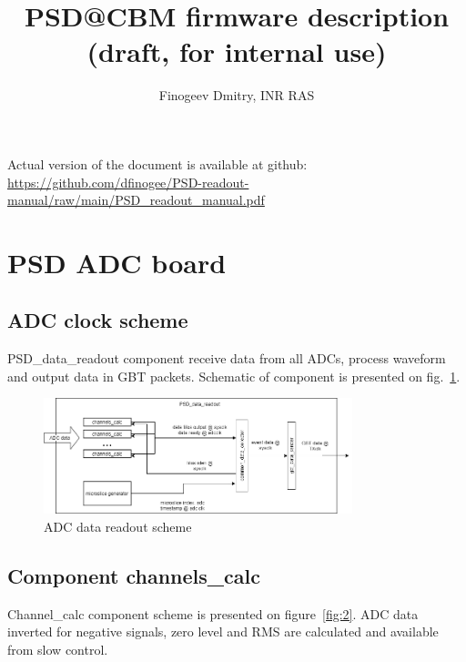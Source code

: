 \documentclass{article}
\title{PSD@CBM firmware description (draft, for internal use)}
\author{Finogeev Dmitry, INR RAS}
\begin{document}
\maketitle

Actual version of the document is available at github:
\newline
\url{https://github.com/dfinogee/PSD-readout-manual/raw/main/PSD_readout_manual.pdf}



\tableofcontents

\newpage

\section{PSD ADC board}







\subsection{ADC clock scheme}\label{adc-clock-desc}




PSD\_data\_readout component receive data from all ADCs, process waveform and output data in GBT packets. Schematic of component is presented on fig.~\ref{fig:1}.

\begin{figure}[H]
	\centering 
	\includegraphics[width=0.8\textwidth]{ADC_readout.png}
	\caption{\label{fig:1} ADC data readout scheme}
\end{figure}








\subsection{Component channels\_calc}
Channel\_calc component scheme is presented on figure~\ref{fig:2}. ADC data inverted for negative signals, zero level and RMS are calculated and available from slow control.
\end{document}
